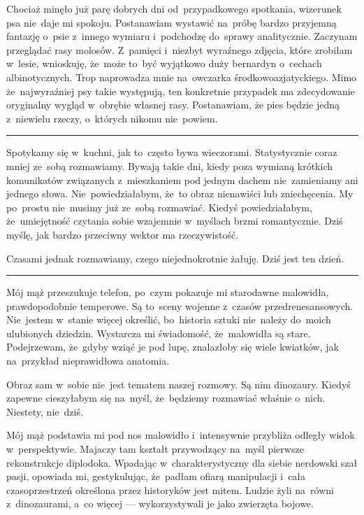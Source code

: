 \documentclass[9pt, a5paper]{memoir}
\begin{document}
Chociaż minęło już parę dobrych dni od~przypadkowego spotkania, wizerunek psa nie~daje mi spokoju. Postanawiam wystawić na~próbę bardzo przyjemną fantazję o~psie z~innego wymiaru i~podchodzę do~sprawy analitycznie. Zaczynam przeglądać rasy molosów.
Z~pamięci i~niezbyt wyraźnego zdjęcia, które zrobiłam w~lesie, wnioskuję, że~może to~być wyjątkowo duży bernardyn o~cechach albinotycznych. Trop naprowadza mnie na~owczarka środkowoazjatyckiego. Mimo że~najwyraźniej psy takie występują, ten konkretnie przypadek ma zdecydowanie oryginalny wygląd w~obrębie własnej rasy. Postanawiam, że pies będzie jedną z~niewielu rzeczy, o~których nikomu nie~powiem.

\fancybreak{* \quad * \quad *}

Spotykamy się w~kuchni, jak to~często bywa wieczorami. Statystycznie coraz mniej ze~sobą rozmawiamy. Bywają takie dni, kiedy poza wymianą krótkich komunikatów związanych z~mieszkaniem pod jednym dachem nie~zamieniamy ani jednego słowa. Nie~powiedziałabym, że~to obraz nienawiści lub zniechęcenia. My po~prostu nie~musimy już ze~sobą rozmawiać. Kiedyś powiedziałabym, że~umiejętność czytania sobie wzajemnie w~myślach brzmi romantycznie. Dziś myślę, jak bardzo przeciwny wektor ma rzeczywistość.

Czasami jednak rozmawiamy, czego niejednokrotnie żałuję. Dziś jest ten dzień.

\fancybreak{* \quad * \quad *}

Mój mąż przeszukuje telefon, po~czym pokazuje mi starodawne malowidła, prawdopodobnie temperowe. Są to~sceny wojenne z~czasów przedrenesansowych. Nie~jestem w~stanie więcej określić, bo~historia sztuki nie~należy do~moich ulubionych dziedzin. Wystarcza mi świadomość, że~malowidła są stare. Podejrzewam, że~gdyby wziąć je pod lupę, znalazłoby się wiele kwiatków, jak na~przykład nieprawidłowa anatomia.

Obraz sam w~sobie nie~jest tematem naszej rozmowy. Są nim dinozaury. Kiedyś zapewne cieszyłabym się na~myśl, że~będziemy rozmawiać właśnie o~nich. Niestety, nie~dziś.

Mój mąż podstawia mi pod nos malowidło i~intensywnie przybliża odległy widok w~perspektywie. Majaczy tam kształt przywodzący na~myśl pierwsze rekonstrukcje diplodoka. Wpadając w~charakterystyczny dla siebie nerdowski szał pasji, opowiada mi, gestykulując, że~padłam ofiarą manipulacji i~cała czasoprzestrzeń określona przez historyków jest mitem. Ludzie żyli na~równi z~dinozaurami, a~co więcej --- wykorzystywali je jako zwierzęta bojowe.
\end{document}
